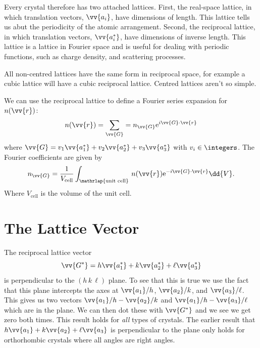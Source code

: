 \documentclass[fleqn]{NotesClass}
\newcommand*{\crystalplane}[3]{(#1\, #2\, #3)}
\newcommand*{\e}{\mathrm{e}}
\begin{document}
    Every crystal therefore has two attached lattices.
    First, the real-space lattice, in which translation vectors, \(\vv{a_i}\), have dimensions of length.
    This lattice tells us abut the periodicity of the atomic arrangement.
    Second, the reciprocal lattice, in which translation vectors, \(\vv{a_i^*}\), have dimensions of inverse length.
    This lattice is a lattice in Fourier space and is useful for dealing with periodic functions, such as charge density, and scattering processes.
    
    All non-centred lattices have the same form in reciprocal space, for example a cubic lattice will have a cubic reciprocal lattice.
    Centred lattices aren't so simple.
    
    We can use the reciprocal lattice to define a Fourier series expansion for \(n(\vv{r})\):
    \begin{equation}
        n(\vv{r}) = \sum_{\vv{G}} = n_{\vv{G}} \e^{i\vv{G}\cdot\vv{r}}
    \end{equation}
    where \(\vv{G} = v_1\vv{a_1^*} + v_2\vv{a_2^*} + v_3\vv{a_3^*}\) with \(v_i\in\integers\).
    The Fourier coefficients are given by
    \begin{equation}
        n_{\vv{G}} = \frac{1}{V_{\text{cell}}} \int_{\mathrlap{\text{unit cell}}} \,n(\vv{r}) \e^{-i\vv{G}\cdot\vv{r}}\dd{V}.
    \end{equation}
    Where \(V_\mathrm{cell}\) is the volume of the unit cell.
    
    \section{The Lattice Vector}
    The reciprocal lattice vector
    \begin{equation}
        \vv{G^*} = h\vv{a_1^*} + k\vv{a_2^*} + \ell\vv{a_3^*}
    \end{equation}
    is perpendicular to the \(\crystalplane{h}{k}{\ell}\) plane.
    To see that this is true we use the fact that this plane intercepts the axes at \(\vv{a_1}/h\), \(\vv{a_2}/k\), and \(\vv{a_3}/\ell\).
    This gives us two vectors \(\vv{a_1}/h - \vv{a_2}/k\) and \(\vv{a_1}/h - \vv{a_3}/\ell\) which are in the plane.
    We can then dot these with \(\vv{G^*}\) and we see we get zero both times.
    This result holds for \emph{all} types of crystals.
    The earlier result that \(h\vv{a_1} + k\vv{a_2} + \ell\vv{a_3}\) is perpendicular to the plane only holds for orthorhombic crystals where all angles are right angles.
    
\end{document}
